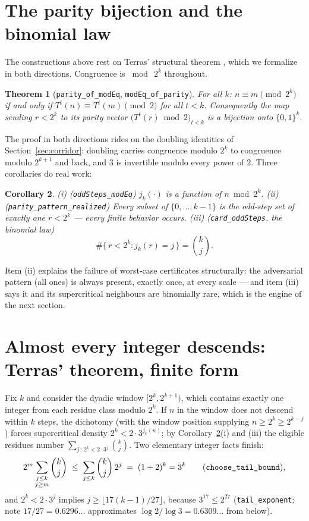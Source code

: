 \documentclass[11pt]{article}
\newtheorem{theorem}{Theorem}[section]
\newtheorem{corollary}[theorem]{Corollary}
\newcommand{\code}[1]{\texttt{#1}}
\newcommand{\jodd}[2]{j_{#1}(#2)}
\begin{document}
\section{The parity bijection and the binomial law}\label{sec:parity}

The constructions above rest on Terras' structural theorem
\cite{terras}, which we formalize in both directions. Congruence is
$\bmod\ 2^k$ throughout.

\begin{theorem}[\code{parity\_of\_modEq}, \code{modEq\_of\_parity}]
\label{thm:bijection}
For all $k$: $n \equiv m \pmod{2^k}$ if and only if
$T^t(n) \equiv T^t(m) \pmod 2$ for all $t < k$. Consequently the map
sending $r < 2^k$ to its parity vector
$\bigl(T^t(r) \bmod 2\bigr)_{t<k}$ is a bijection onto $\{0,1\}^k$.
\end{theorem}

The proof in both directions rides on the doubling identities of
Section~\ref{sec:corridor}: doubling carries congruence modulo $2^k$
to congruence modulo $2^{k+1}$ and back, and $3$ is invertible modulo
every power of $2$. Three corollaries do real work:

\begin{corollary}\label{cor:parity-consequences}
\emph{(i)} (\code{oddSteps\_modEq}) $\jodd{k}{\cdot}$ is a function of
$n \bmod 2^k$.
\emph{(ii)} (\code{parity\_pattern\_realized}) Every subset of
$\{0, \dots, k-1\}$ is the odd-step set of exactly one $r < 2^k$ ---
every finite behavior occurs.
\emph{(iii)} (\code{card\_oddSteps}, the binomial law)
\[
\#\bigl\{\, r < 2^k : \jodd{k}{r} = j \,\bigr\} = \binom{k}{j}.
\]
\end{corollary}

Item (ii) explains the failure of worst-case certificates
structurally: the adversarial pattern (all ones) is always present,
exactly once, at every scale --- and item (iii) says it and its
supercritical neighbours are binomially rare, which is the engine of
the next section.

\section{Almost every integer descends: Terras' theorem, finite form}
\label{sec:terras}

Fix $k$ and consider the dyadic window $[2^k, 2^{k+1})$, which
contains exactly one integer from each residue class modulo $2^k$. If
$n$ in the window does not descend within $k$ steps, the dichotomy
(with the window position supplying $n \ge 2^k \ge 2^{k-j}$) forces
supercritical density $2^k < 2\cdot 3^{\jodd{k}{n}}$; by
Corollary~\ref{cor:parity-consequences}(i) and (iii) the eligible
residues number $\sum_{j \,:\, 2^k < 2\cdot 3^j} \binom{k}{j}$. Two
elementary integer facts finish:
\[
2^m \sum_{\substack{j \le k \\ j \ge m}} \binom{k}{j}
\;\le\; \sum_{j \le k} \binom{k}{j}\, 2^j \;=\; (1+2)^k = 3^k
\qquad\text{(\code{choose\_tail\_bound})},
\]
and $2^k < 2 \cdot 3^j$ implies $j \ge \lfloor 17(k-1)/27 \rfloor$,
because $3^{17} \le 2^{27}$ (\code{tail\_exponent}; note
$17/27 = 0.6296\ldots$ approximates $\log 2/\log 3 = 0.6309\ldots$
from below).
\end{document}
